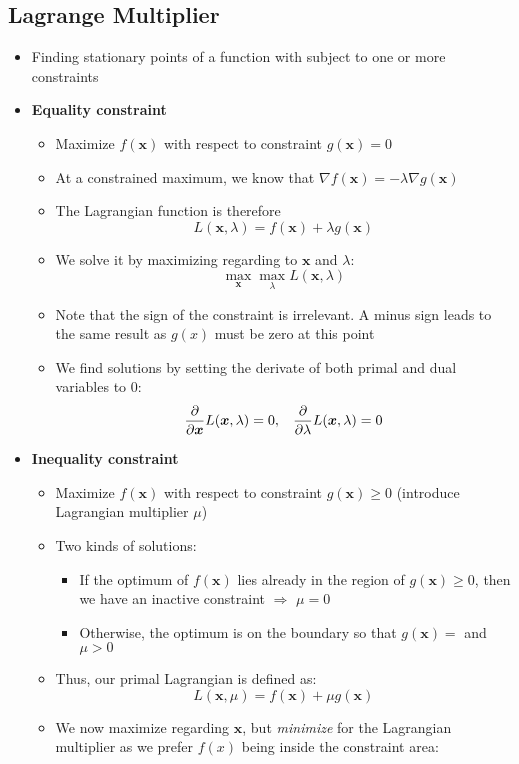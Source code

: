 \subsection{Lagrange Multiplier}
\begin{itemize}
	\item Finding stationary points of a function with subject to one or more constraints
	\item \textbf{Equality constraint}
	\begin{itemize}
		\item Maximize $f(\bm{x})$ with respect to constraint $g(\bm{x})=0$
		\item At a constrained maximum, we know that $\nabla f(\bm{x}) = -\lambda \nabla g(\bm{x})$
		\item The Lagrangian function is therefore $$ L(\bm{x}, \lambda) = f(\bm{x}) + \lambda g(\bm{x})$$
		\item We solve it by maximizing regarding to $\bm{x}$ and $\lambda$: $$\max_{\bm{x}} \max_{\lambda} L(\bm{x}, \lambda)$$
		\item Note that the sign of the constraint is irrelevant. A minus sign leads to the same result as $g(x)$ must be zero at this point
		\item We find solutions by setting the derivate of both primal and dual variables to 0:
		$$\frac{\partial }{\partial \bm{x}} L(\bm{x}, \lambda) = 0, \text{\hspace{3mm}} \frac{\partial }{\partial \lambda} L(\bm{x}, \lambda) = 0$$
	\end{itemize}
	\item \textbf{Inequality constraint}
	\begin{itemize}
		\item Maximize $f(\bm{x})$ with respect to constraint $g(\bm{x})\geq0$ (introduce Lagrangian multiplier $\mu$)
		\item Two kinds of solutions:
		\begin{itemize}
			\item If the optimum of $f(\bm{x})$ lies already in the region of $g(\bm{x})\geq0$, then we have an inactive constraint $\Rightarrow$ $\mu=0$
			\item Otherwise, the optimum is on the boundary so that $g(\bm{x})=$ and $\mu> 0$
		\end{itemize}
		\item Thus, our primal Lagrangian is defined as:
		$$L(\bm{x}, \mu) = f(\bm{x}) + \mu g(\bm{x})$$
		\item We now maximize regarding $\bm{x}$, but \textit{minimize} for the Lagrangian multiplier as we prefer $f(x)$ being inside the constraint area:

\end{itemize}
\end{itemize}
